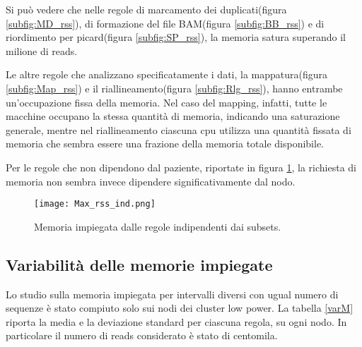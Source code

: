 Si può vedere che nelle regole di marcamento dei duplicati(figura \ref{subfig:MD_rss}), di formazione del file BAM(figura \ref{subfig:BB_rss}) e di riordimento per picard(figura \ref{subfig:SP_rss}), la memoria satura superando il milione di reads. 

Le altre regole che analizzano specificatamente i dati, la mappatura(figura \ref{subfig:Map_rss}) e il riallineamento(figura \ref{subfig:Rlg_rss}), hanno entrambe un'occupazione fissa della memoria.
Nel caso del mapping, infatti, tutte le macchine occupano la stessa quantità di memoria, indicando una saturazione generale, mentre nel riallineamento ciascuna cpu utilizza una quantità fissata di memoria che sembra essere una frazione della memoria totale disponibile. 

Per le regole che non dipendono dal paziente, riportate in figura \ref{fig:RSSind}, la richiesta di memoria non sembra invece dipendere significativamente dal nodo.

\begin{figure}[H]
\centering
\texttt{[image: Max\_rss\_ind.png]}
\caption{Memoria impiegata dalle regole indipendenti dai subsets.}
\label{fig:RSSind}
\end{figure}

\subsection{Variabilità delle memorie impiegate}
Lo studio sulla memoria impiegata per intervalli diversi con ugual numero di sequenze è stato compiuto solo sui nodi dei cluster low power. 
La tabella \ref{varM} riporta la media e la deviazione standard per ciascuna regola, su ogni nodo.
In particolare il numero di reads considerato è stato di centomila.

\begin{table}[H]
\centering
{}
\caption{Media e deviazione standard, espresse in MB, della memoria occupata dalle regole su diversi subset da centomila reads.}
\label{varM}
\end{table}

